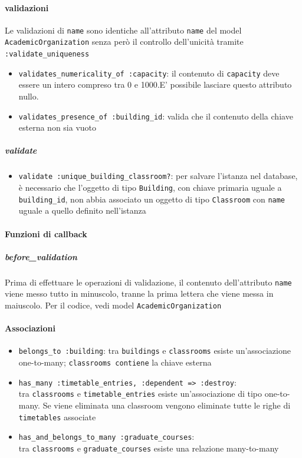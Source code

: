\documentclass[11pt,a4paper]{article}
\begin{document}
\paragraph{validazioni}
Le validazioni di \verb|name| sono identiche all'attributo \verb|name| del model \verb|AcademicOrganization|  senza però il controllo dell'unicità tramite \verb|:validate_uniqueness|
\begin{itemize}
\item \verb|validates_numericality_of :capacity|: il contenuto di \verb|capacity| deve essere un intero compreso tra 0 e 1000.E' possibile lasciare questo attributo nullo.
\item \verb|validates_presence_of :building_id|: valida che il contenuto della chiave esterna non sia vuoto 
\end{itemize}
\subparagraph{validate}
\begin{itemize}
 \item \verb|validate :unique_building_classroom?|: per salvare l'istanza nel database, è necessario che l'oggetto di tipo \verb|Building|, con chiave primaria uguale a \verb|building_id|, non abbia associato un oggetto di tipo \verb|Classroom| con \verb|name| uguale a quello definito nell'istanza
\end{itemize}
\paragraph{Funzioni di callback}
\subparagraph{before\_validation}
Prima di effettuare le operazioni di validazione, il contenuto dell'attributo \verb|name| viene messo tutto in minuscolo, tranne la prima lettera che viene messa in maiuscolo. Per il codice, vedi model \verb|AcademicOrganization|
\paragraph{Associazioni}
\begin{itemize}
 \item \verb|belongs_to :building|: tra \verb|buildings| e \verb|classrooms| esiste un'associazione one-to-many; \verb|classrooms contiene| la chiave esterna
 \item \verb|has_many :timetable_entries, :dependent => :destroy|:\\ tra \verb|classrooms| e \verb|timetable_entries| esiste un'associazione di tipo one-to-many. Se viene eliminata una classroom vengono eliminate tutte le righe di \verb|timetables| associate
\item \verb|has_and_belongs_to_many :graduate_courses|:\\tra \verb|classrooms| e \verb|graduate_courses| esiste una relazione many-to-many 
\end{itemize}
\end{document}
